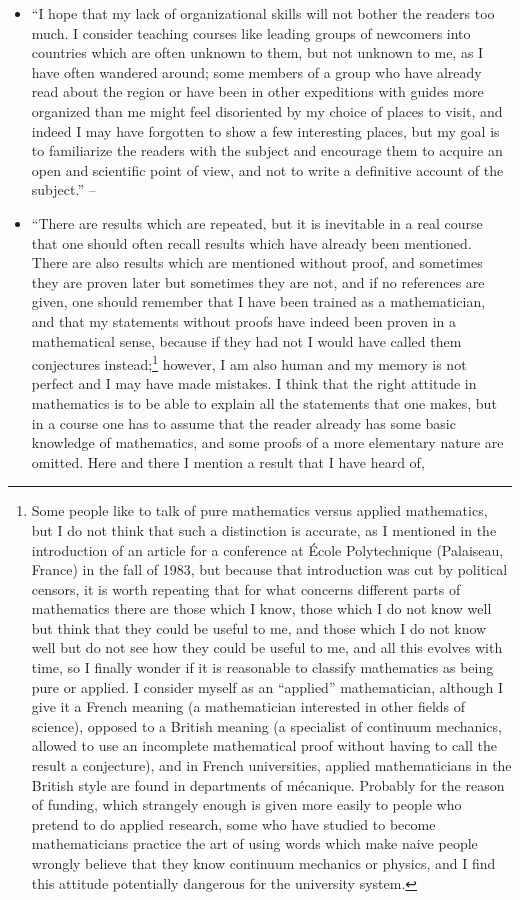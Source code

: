 \documentclass{article}
\numberwithin{equation}{section}
\begin{document}
\begin{enumerate}
\begin{itemize}
		\item ``I hope that my lack of organizational skills will not bother the readers too much. I consider teaching courses like leading groups of newcomers into countries which are often unknown to them, but not unknown to me, as I have often wandered around; some members of a group who have already read about the region or have been in other expeditions with guides more organized than me might feel disoriented by my choice of places to visit, and indeed I may have forgotten to show a few interesting places, but my goal is to familiarize the readers with the subject and encourage them to acquire an open and scientific point of view, and not to write a definitive account of the subject.'' -- \cite[Preface, p. xii]{Tartar2006}
		\item ``There are results which are repeated, but it is inevitable in a real course that one should often recall results which have already been mentioned. There are also results which are mentioned without proof, and sometimes they are proven later but sometimes they are not, and if no references are given, one should remember that I have been trained as a mathematician, and that my statements without proofs have indeed been proven in a mathematical sense, because if they had not I would have called them conjectures instead;\footnote{Some people like to talk of pure mathematics versus applied mathematics, but I do not think that such a distinction is accurate, as I mentioned in the introduction of an article for a conference at \'Ecole Polytechnique (Palaiseau, France) in the fall of 1983, but because that introduction was cut by political censors, it is worth repeating that for what concerns different parts of mathematics there are those which I know, those which I do not know well but think that they could be useful to me, and those which I do not know well but do not see how they could be useful to me, and all this evolves with time, so I finally wonder if it is reasonable to classify mathematics as being pure or applied. I consider myself as an ``applied'' mathematician, although I give it a French meaning (a mathematician interested in other fields of science), opposed to a British meaning (a specialist of continuum mechanics, allowed to use an incomplete mathematical proof without having to call the result a conjecture), and in French universities, applied mathematicians in the British style are found in departments of m\'ecanique. Probably for the reason of funding, which strangely enough is given more easily to people who pretend to do applied research, some who have studied to become mathematicians practice the art of using words which make naive people wrongly believe that they know continuum mechanics or physics, and I find this attitude potentially dangerous for the university system.} however, I am also human and my memory is not perfect and I may have made mistakes. I think that the right attitude in mathematics is to be able to explain all the statements that one makes, but in a course one has to assume that the reader already has some basic knowledge of mathematics, and some proofs of a more elementary nature are omitted. Here and there I mention a result that I have heard of, 
\end{itemize}
\end{enumerate}
\end{document}
